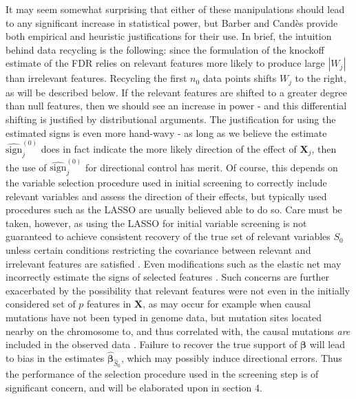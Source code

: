 \documentclass[]{scrartcl}
\newcommand{\1}[1]{\mathbbm{1}_{\left\{#1\right\}}}
\begin{document}
It may seem somewhat surprising that either of these manipulations should lead to any significant increase in statistical power, but Barber and Cand\`es provide both empirical and heuristic justifications for their use. In brief, the intuition behind data recycling is the following: since the formulation of the knockoff estimate of the FDR relies on relevant features more likely to produce large $|W_{j}|$ than irrelevant features. Recycling the first $n_{0}$ data points shifts $W_{j}$ to the right, as will be described below. If the relevant features are shifted to a greater degree than null features, then we should see an increase in power - and this differential shifting is justified by distributional arguments. The justification for using the estimated signs is even more hand-wavy - as long as we believe the estimate $\widehat{\text{sign}}^{(0)}_{j}$ does in fact indicate the more likely direction of the effect of $\mathbf{\mathbf{X}}_{j}$, then the use of $\widehat{\text{sign}}^{(0)}_{j}$ for directional control has merit. Of course, this depends on the variable selection procedure used in initial screening to correctly include relevant variables and assess the direction of their effects, but typically used procedures such as the LASSO are usually believed able to do so. Care must be taken, however, as using the LASSO for initial variable screening is not guaranteed to achieve consistent recovery of the true set of relevant variables $S_{0}$ unless certain conditions restricting the covariance between relevant and irrelevant features are satisfied \cite{adlso, rndlso}. Even modifications such as the elastic net may incorrectly estimate the signs of selected features \cite{rndlso}. Such concerns are further exacerbated by the possibility that relevant features were not even in the initially considered set of $p$ features in $\mathbf{X}$, as may occur for example when causal mutations have not been typed in genome data, but mutation sites located nearby on the chromosome to, and thus correlated with, the causal mutations \textit{are} included in the observed data \cite{kohd}. Failure to recover the true support of $\pmb{\beta}$ will lead to bias in the estimates $\widehat{\pmb{\beta}}_{\widehat{S}_{0}}$, which may possibly induce directional errors. Thus the performance of the selection procedure used in the screening step is of significant concern, and will be elaborated upon in section 4.
\end{document}
